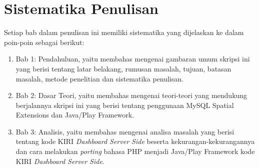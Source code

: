 \section{Sistematika Penulisan}
\label{sec:sistematika_penulisan}
Setiap bab dalam penulisan ini memiliki sistematika yang dijelaskan ke dalam poin-poin sebagai berikut:
	\begin{enumerate}
		\item Bab 1: Pendahuluan, yaitu membahas mengenai gambaran umum skripsi ini yang berisi tentang latar belakang, rumusan masalah, tujuan, batasan masalah, metode penelitian dan sistematika penulisan.
		\item Bab 2: Dasar Teori, yaitu membahas mengenai teori-teori yang mendukung berjalannya skripsi ini yang berisi tentang penggunaan MySQL Spatial Extensions dan Java/Play Framework.
		\item Bab 3: Analisis, yaitu membahas mengenai analisa masalah yang berisi tentang kode KIRI \textit{Dashboard Server Side} beserta kekurangan-kekurangannya dan cara melakukan \textit{porting} bahasa PHP menjadi Java/Play Framework kode KIRI \textit{Dashboard Server Side}.
	\end{enumerate}